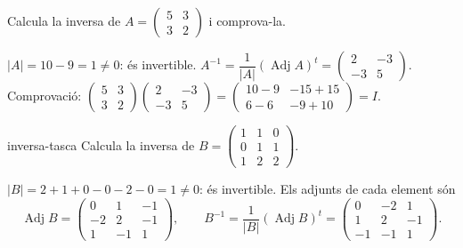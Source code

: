 \begin{apartats}

Calcula la inversa de $A=\begin{pmatrix}5&3\\3&2\end{pmatrix}$ i comprova-la.

\begin{solucio}
$|A|=10-9=1\ne0$: és invertible. $A^{-1}=\dfrac1{|A|}(\operatorname{Adj}A)^t=\begin{pmatrix}2&-3\\-3&5\end{pmatrix}$.\\
Comprovació: $\begin{pmatrix}5&3\\3&2\end{pmatrix}\begin{pmatrix}2&-3\\-3&5\end{pmatrix}
=\begin{pmatrix}10-9&-15+15\\6-6&-9+10\end{pmatrix}=I$.
\end{solucio}

\begin{tria}{inversa-tasca}
Calcula la inversa de $B=\begin{pmatrix}1&1&0\\0&1&1\\1&2&2\end{pmatrix}$.

\begin{solucio}
$|B|=2+1+0-0-2-0=1\ne0$: és invertible. Els adjunts de cada element són
\[
\operatorname{Adj}B=\begin{pmatrix}0&1&-1\\-2&2&-1\\1&-1&1\end{pmatrix},\qquad
B^{-1}=\frac1{|B|}(\operatorname{Adj}B)^t=\begin{pmatrix}0&-2&1\\1&2&-1\\-1&-1&1\end{pmatrix}.
\]
\end{solucio}


\end{tria}
\end{apartats}
